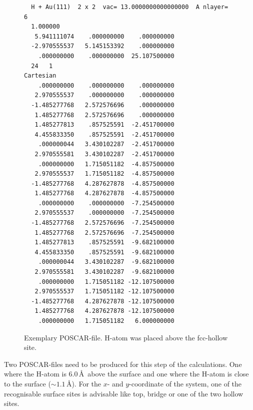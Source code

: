 \documentclass[twoside, 11pt, titlepage, captions=nooneline, a4paper, headsepline]{scrbook}%
\newcommand{\9}{\mathrm}
\newcommand{\0}{\,\mathrm}
\begin{document}
\begin{figure}[h!!]
\begin{verbatim}
  H + Au(111)  2 x 2  vac= 13.0000000000000000  A nlayer=  6 
  1.000000
   5.941111074    .000000000    .000000000
  -2.970555537   5.145153392    .000000000
    .000000000    .000000000  25.107500000
  24   1
Cartesian
    .000000000    .000000000    .000000000
   2.970555537    .000000000    .000000000
  -1.485277768   2.572576696    .000000000
   1.485277768   2.572576696    .000000000
   1.485277813    .857525591  -2.451700000
   4.455833350    .857525591  -2.451700000
    .000000044   3.430102287  -2.451700000
   2.970555581   3.430102287  -2.451700000
    .000000000   1.715051182  -4.857500000
   2.970555537   1.715051182  -4.857500000
  -1.485277768   4.287627878  -4.857500000
   1.485277768   4.287627878  -4.857500000
    .000000000    .000000000  -7.254500000
   2.970555537    .000000000  -7.254500000
  -1.485277768   2.572576696  -7.254500000
   1.485277768   2.572576696  -7.254500000
   1.485277813    .857525591  -9.682100000
   4.455833350    .857525591  -9.682100000
    .000000044   3.430102287  -9.682100000
   2.970555581   3.430102287  -9.682100000
    .000000000   1.715051182 -12.107500000
   2.970555537   1.715051182 -12.107500000
  -1.485277768   4.287627878 -12.107500000
   1.485277768   4.287627878 -12.107500000
    .000000000   1.715051182   6.000000000

\end{verbatim}
\caption{Exemplary POSCAR-file. H-atom was placed above the fcc-hollow site.}
\label{cpos}
\end{figure}
\clearpage
Two POSCAR-files need to be produced for this step of the calculations. One where the H-atom is 6.0\,\AA~above the surface and one where the H-atom is close to the surface ($\sim 1.1$\,\AA). For the $x$- and $y$-coordinate of the system, one of the recognisable surface sites is advisable like top, bridge or one of the two hollow sites.\\
\end{document}
